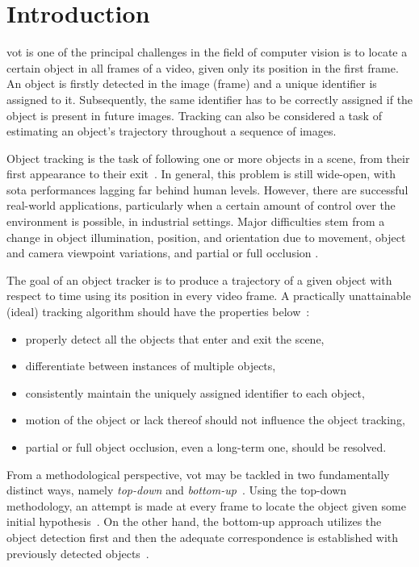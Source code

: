\chapter{Introduction}
\label{chap:Introduction}

\Gls{vot} is one of the principal challenges in the field of computer vision is to locate a certain object in all frames of a video, given only its position in the first frame. An object is firstly detected in the image (frame) and a unique identifier is assigned to it. Subsequently, the same identifier has to be correctly assigned if the object is present in future images. Tracking can also be considered a task of estimating an object’s trajectory throughout a sequence of images.

Object tracking is the task of following one or more objects in a scene, from their first appearance to their exit~\cite{forsyth2012computer}. In general, this problem is still wide-open, with \gls{sota} performances lagging far behind human levels. However, there are successful real-world applications, particularly when a certain amount of control over the environment is possible, \egtext{} in industrial settings. Major difficulties stem from a change in object illumination, position, and orientation due to movement, object and camera viewpoint variations, and partial or full occlusion \cite{jalal2012sotavot}.

The goal of an object tracker is to produce a trajectory of a given object with respect to time using its position in every video frame. A practically unattainable (ideal) tracking algorithm should have the properties below~\cite{jalal2012sotavot}:
\begin{itemize}
    \item properly detect all the objects that enter and exit the scene,
    \item differentiate between instances of multiple objects,
    \item consistently maintain the uniquely assigned identifier to each object,
    \item motion of the object or lack thereof should not influence the object tracking,
    \item partial or full object occlusion, even a long-term one, should be resolved.
\end{itemize}

From a methodological perspective, \gls{vot} may be tackled in two fundamentally distinct ways, namely \emph{top-down} and \emph{bottom-up}~\cite{jalal2012sotavot}. Using the top-down methodology, an attempt is made at every frame to locate the object given some initial hypothesis~\cite{comaniciu2003kernel}. On the other hand, the bottom-up approach utilizes the object detection first and then the adequate correspondence is established with previously detected objects~\cite{wren1997pfinder}.

